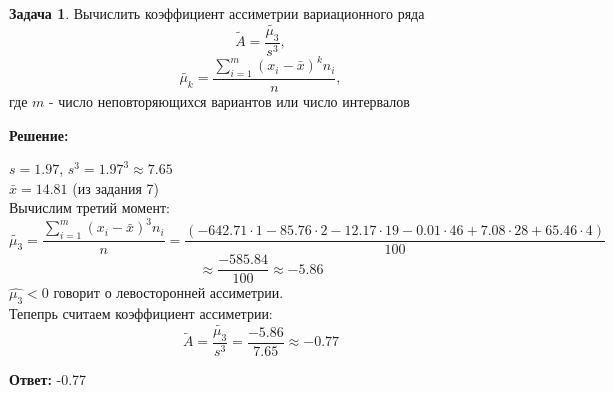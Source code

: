 \documentclass[a4paper,12pt]{article}
\theoremstyle{definition}
\newtheorem{problem}{Задача}\setlength{\parindent}{0pt}
\newenvironment{solution}
{\begin{shaded}\textbf{Решение:}\par\setlength{\parindent}{0pt}}
{\end{shaded}}
\newenvironment{answer}
{\par\noindent\textbf{Ответ:} }
{\par}
\begin{document}
\vspace{8pt}
\begin{problem}
    Вычислить коэффициент ассиметрии вариационного ряда
    \[\tilde{A} = \frac{\tilde{\mu_3}}{s^3},\]
    \[\tilde{\mu_k} = \frac{\sum^m_{i=1}(x_i - \bar{x})^k n_i}{n},\] 
    где \(m\) - число неповторяющихся вариантов или число интервалов     
        
    \begin{solution}
        \(s = 1.97\), \( s^3 = 1.97^3 \approx 7.65 \)\\
        \(\bar{x} = 14.81\) (из задания 7)\\

        Вычислим третий момент:
        \[ \tilde{\mu_3} = \frac{\sum^m_{i=1}(x_i - \bar{x})^3 n_i}{n} = 
        \frac{(      -642.71\cdot1 
                     -85.76\cdot2 
                     -12.17\cdot19
                     -0.01\cdot46
                     +7.08\cdot28
                     +65.46\cdot4
                     )}{100} \]
            \[ \approx \frac{-585.84}{100} \approx -5.86 \]
        \(\hat{\mu_3} < 0\) говорит о левосторонней ассиметрии. \\
        
        Тепепрь считаем коэффициент ассиметрии:
        \[ \tilde{A} = \frac{\tilde{\mu_3}}{s^3} = \frac{-5.86}{7.65} \approx - 0.77\]

        \end{solution}
    
        \begin{answer}
            -0.77
        \end{answer}
    
    \end{problem}
\end{document}
